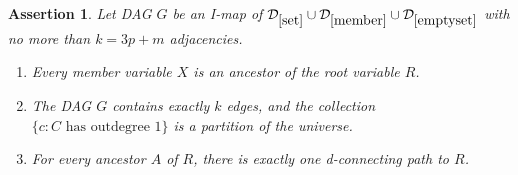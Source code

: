\documentclass{elsarticle}%
\newtheorem{assertion}[theorem]{Assertion}
\newcommand{\A}{A}
\newcommand{\R}{R}
\newcommand{\X}{X}
\newcommand{\C}{C}
\newcommand{\G}{G}
\newcommand{\D}{\mathcal{D}}
\renewcommand{\c}{c}
\begin{document}
\begin{assertion} \label{ass:unique-path}
Let DAG $\G$ be an I-map of  $\D_{\ref{set}}\cup \D_{\ref{member}}\cup
\D_{\ref{emptyset}}$ with no more than $k = 3p +m$ adjacencies. 
\begin{enumerate}
\item Every member variable $\X$ is an ancestor of the root variable $\R$. \label{clause:ancestor} 
\item The DAG $\G$ contains exactly $k$ edges, and the collection $\{\c: \C \mbox{ has outdegree 1}\}$ is a partition of the universe. \label{clause:exact-bound}
\item For every ancestor $\A$ of $\R$, there is exactly one d-connecting path to $\R$. \label{clause:unique-path} 
\end{enumerate}

\end{assertion}
 
\end{document}
